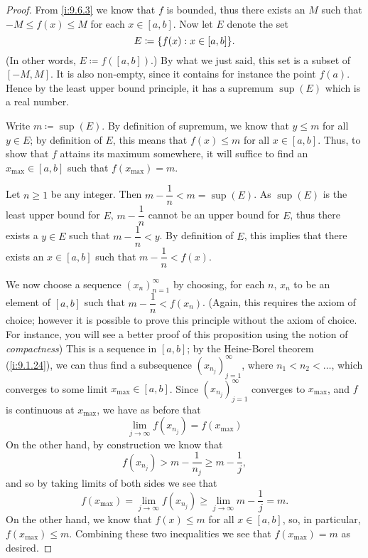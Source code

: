 \begin{proof}
  From \cref{i:9.6.3} we know that \(f\) is bounded, thus there exists an \(M\) such that \(-M \leq f(x) \leq M\) for each \(x \in [a, b]\).
  Now let \(E\) denote the
  set
  \[
    E \coloneqq \set{f(x) : x \in [a, b]}.
  \]
  (In other words, \(E \coloneqq f([a, b])\).)
  By what we just said, this set is a subset of \([-M, M]\).
  It is also non-empty, since it contains for instance the point \(f(a)\).
  Hence by the least upper bound principle, it has a supremum \(\sup(E)\) which is a real number.

  Write \(m \coloneqq \sup(E)\).
  By definition of supremum, we know that \(y \leq m\) for all \(y \in E\);
  by definition of \(E\), this means that \(f(x) \leq m\) for all \(x \in [a, b]\).
  Thus, to show that \(f\) attains its maximum somewhere, it will suffice to find an \(x_{\max} \in [a, b]\) such that \(f(x_{\max}) = m\).

  Let \(n \geq 1\) be any integer.
  Then \(m - \dfrac{1}{n} < m = \sup(E)\).
  As \(\sup(E)\) is the least upper bound for \(E\), \(m - \dfrac{1}{n}\) cannot be an upper bound for \(E\), thus there exists a \(y \in E\) such that \(m - \dfrac{1}{n} < y\).
  By definition of \(E\), this implies that there exists an \(x \in [a, b]\) such that \(m - \dfrac{1}{n} < f(x)\).

  We now choose a sequence \((x_n)_{n = 1}^\infty\) by choosing, for each \(n\), \(x_n\) to be an element of \([a, b]\) such that \(m - \dfrac{1}{n} < f(x_n)\).
  (Again, this requires the axiom of choice;
  however it is possible to prove this principle without the axiom of choice.
  For instance, you will see a better proof of this proposition using the notion of \emph{compactness})
  This is a sequence in \([a, b]\);
  by the Heine-Borel theorem (\cref{i:9.1.24}), we can thus find a subsequence \((x_{n_j})_{j = 1}^\infty\), where \(n_1 < n_2 < \dots\), which converges to some limit \(x_{\max} \in [a, b]\).
  Since \((x_{n_j})_{j = 1}^\infty\) converges to \(x_{\max}\), and \(f\) is continuous at \(x_{\max}\), we have as before that
  \[
    \lim_{j \to \infty} f(x_{n_j}) = f(x_{\max})
  \]
  On the other hand, by construction we know that
  \[
    f(x_{n_j}) > m - \dfrac{1}{n_j} \geq m - \dfrac{1}{j},
  \]
  and so by taking limits of both sides we see that
  \[
    f(x_{\max}) = \lim_{j \to \infty} f(x_{n_j}) \geq \lim_{j \to \infty} m - \dfrac{1}{j} = m.
  \]
  On the other hand, we know that \(f(x) \leq m\) for all \(x \in [a, b]\), so, in particular, \(f(x_{\max}) \leq m\).
  Combining these two inequalities we see that \(f(x_{\max}) = m\) as desired.


\end{proof}
